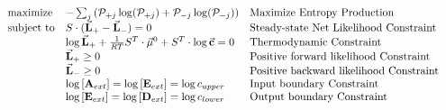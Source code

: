 \[
\begin{array}{llll}
  &  \text{maximize}  &  - \sum_j\left(\mathcal P_{+j}\log(\mathcal P_{+j}) +  \mathcal P_{-j}\log(\mathcal P_{-j})\right) & \text{Maximize Entropy Production}  \\
   & \text{subject to}  & S\cdot(\vec{\bf L}_+-\vec{\bf L}_-) = 0  &  \text{Steady-state Net Likelihood Constraint} \\
     &                  &\log\vec{\bf L}_+ +\frac{1}{RT}S^T\cdot\vec{\mu}^0 + S^T\cdot\log\vec{\bf c} = 0 & \text{Thermodynamic Constraint} \\
      &                   & \vec{\bf L}_+ \geq 0 & \text{Positive forward likelihood Constraint} \\
       &                  & \vec{\bf L}_- \geq 0 & \text{Positive backward likelihood Constraint} \\
        &              & \log \left[{\bf A}_{ext}\right] = \log \left[{\bf E}_{ext}\right] =  \log c_{upper} & \text{Input boundary Constraint} \\
       &               & \log \left[{\bf E}_{ext}\right] = \log \left[{\bf D}_{ext}\right] = \log c_{lower}  & \text{Output boundary Constraint} \\         
\end{array}\]